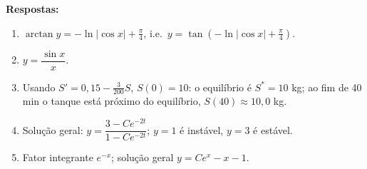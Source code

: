 \medskip
\noindent\textbf{Respostas:}
\begin{enumerate}
  \item $\arctan y = -\ln|\cos x| + \tfrac{\pi}{4}$, i.e.\
        $y=\tan\!\left(-\ln|\cos x|+\tfrac{\pi}{4}\right)$.
  \item $y = \dfrac{\sin x}{x}$.
  \item Usando $S' = 0{,}15 - \tfrac{3}{200}S$, $S(0)=10$: o equilíbrio é
        $S^{*}=10$ kg; ao fim de 40 min o tanque está próximo do equilíbrio,
        $S(40)\approx 10{,}0$ kg.
  \item Solução geral: $y = \dfrac{3 - Ce^{-2t}}{1 - Ce^{-2t}}$;
        $y=1$ é instável, $y=3$ é estável.
  \item Fator integrante $e^{-x}$; solução geral $y = Ce^x - x - 1$.
\end{enumerate}